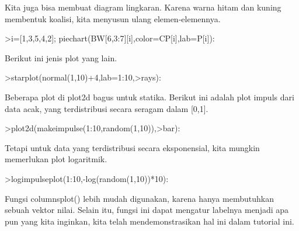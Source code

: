 \documentclass[a4paper,10pt]{article}
\begin{document}
\begin{eulernotebook}
\begin{eulercomment}
Kita juga bisa membuat diagram lingkaran. Karena warna hitam dan
kuning membentuk koalisi, kita menyusun ulang elemen-elemennya.
\end{eulercomment}
\begin{eulerprompt}
>i=[1,3,5,4,2]; piechart(BW[6,3:7][i],color=CP[i],lab=P[i]):
\end{eulerprompt}
\begin{eulercomment}
Berikut ini jenis plot yang lain.
\end{eulercomment}
\begin{eulerprompt}
>starplot(normal(1,10)+4,lab=1:10,>rays):
\end{eulerprompt}
\begin{eulercomment}
Beberapa plot di plot2d bagus untuk statika. Berikut ini adalah plot
impuls dari data acak, yang terdistribusi secara seragam dalam [0,1].
\end{eulercomment}
\begin{eulerprompt}
>plot2d(makeimpulse(1:10,random(1,10)),>bar):
\end{eulerprompt}
\begin{eulercomment}
Tetapi untuk data yang terdistribusi secara eksponensial, kita mungkin
memerlukan plot logaritmik.
\end{eulercomment}
\begin{eulerprompt}
>logimpulseplot(1:10,-log(random(1,10))*10):
\end{eulerprompt}
\begin{eulercomment}
Fungsi columnsplot() lebih mudah digunakan, karena hanya membutuhkan
sebuah vektor nilai. Selain itu, fungsi ini dapat mengatur labelnya
menjadi apa pun yang kita inginkan, kita telah mendemonstrasikan hal
ini dalam tutorial ini.


\end{eulercomment}
\end{eulernotebook}
\end{document}
